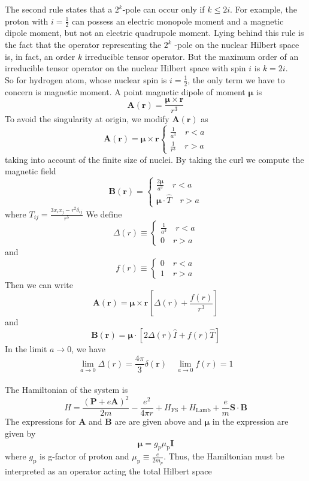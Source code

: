 The second rule states that a $2^k$-pole can occur only if $k \leq 2i$. For example, the proton with $i = \frac{1}{2}$ can possess an electric monopole moment and a magnetic dipole moment, but not an electric quadrupole moment. Lying behind this rule is the fact that the operator representing the $2^k$ -pole on the nuclear Hilbert space is, in fact, an order $k$ irreducible tensor operator. But the maximum order of an irreducible tensor operator on the nuclear Hilbert space with
spin $i$ is $k = 2i$.\\
So for hydrogen atom, whose nuclear spin is $i = \frac{1}{2}$, the only term we have to concern is magnetic moment. A point magnetic dipole of moment $\bm{\mu}$ is
\[\bm{A}(\bm{r}) = \frac{\bm{\mu}\times\bm{r}}{r^3}\]
To avoid the singularity at origin, we modify $\bm{A}(\bm{r})$ as
\[\bm{A}(\bm{r}) = \bm{\mu}\times\bm{r} \begin{cases} \frac{1}{a^3} \quad r < a\\ \frac{1}{r^3} \quad r > a\end{cases} \]
taking into account of the finite size of nuclei. 
By taking the curl we compute the magnetic field
\[\bm{B}(\bm{r}) =  \begin{cases} \frac{2\bm{\mu}}{a^3} \quad r < a\\ \bm{\mu}\cdot\hat{T} \quad r > a\end{cases} \]
where $T_{ij} = \frac{3x_ix_j-r^2\delta_{ij}}{r^5}$
We define
\[\Delta(r) \equiv \begin{cases} \frac{1}{a^3} \quad r < a\\ 0 \quad r > a\end{cases}\]
and
\[f(r) \equiv \begin{cases} 0 \quad r < a\\ 1 \quad r > a\end{cases}\]
Then we can write
\[\bm{A}(\bm{r}) = \bm{\mu}\times\bm{r} \left [\Delta(r) + \frac{f(r)}{r^3}\right ] \]
and
\[\bm{B}(\bm{r}) = \bm{\mu}\cdot \left [2\Delta(r)\hat{I} + f(r)\hat{T}\right ] \]
In the limit $a \to 0$, we have
\[\lim_{a \to 0} \Delta(r) = \frac{4\pi}{3}\delta(\bm{r}) \quad \lim_{a \to 0} f(r) = 1\]\\
The Hamiltonian of the system is
\[H = \frac{(\bm{P}+e\bm{A})^2}{2m} - \frac{e^2}{4\pi r} + H_{\mathrm{FS}} + H_{\mathrm{Lamb}} + \frac{e}{m}\bm{S}\cdot\bm{B}\]
The expressions  for $\bm{A}$ and $\bm{B}$ are are given above and $\bm{\mu}$ in the expression are given by
\[\bm{\mu} = g_{p} \mu_{\mathrm{p}} \bm{I}\]
where $g_{\mathrm{p}}$ is g-factor of proton and $\mu_{\mathrm{p}} \equiv \frac{e}{2m_p}$. Thus, the Hamiltonian must be interpreted as an operator acting the total Hilbert space
